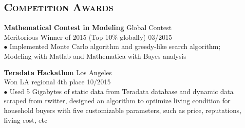 \documentclass[line, margin]{res}
\begin{document}
\begin{resume}
\section{\textsc{Competition Awards}}
\textbf{Mathematical Contest in Modeling} \hfill  Global Contest\\
Meritorious Winner of 2015 (Top 10\% globally) \hfill 03/2015\\
$\bullet$ Implemented Monte Carlo algorithm and greedy-like search algorithm; Modeling with Matlab and Mathematica with Bayes analysis

\textbf{Teradata Hackathon} \hfill  Los Angeles\\
Won LA regional 4th place \hfill 10/2015\\
$\bullet$ Used 5 Gigabytes of static data from Teradata database and dynamic data scraped from twitter, designed an algorithm to optimize living condition for household buyers with five customizable parameters, such as price, reputations, living cost, etc


\end{resume}
\end{document}
